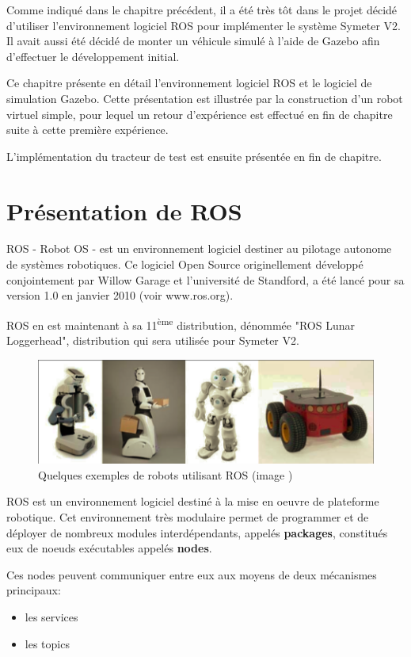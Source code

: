 \documentclass[12pt,a4paper]{report}
\begin{document}
Comme indiqué dans le chapitre précédent, il a été très tôt dans le projet décidé d'utiliser l'environnement logiciel ROS pour implémenter le système Symeter V2. Il avait aussi été décidé de monter un véhicule simulé à l'aide de Gazebo afin d'effectuer le développement initial.



\para Ce chapitre présente en détail l'environnement logiciel ROS et le logiciel de simulation Gazebo. Cette présentation est illustrée par la construction d'un robot virtuel simple, pour lequel un retour d'expérience est effectué en fin de chapitre suite à cette première expérience.

\para L'implémentation du tracteur de test est ensuite présentée en fin de chapitre.

	\section{Présentation de ROS}
	
	ROS - Robot OS - est un environnement logiciel destiner au pilotage autonome de systèmes robotiques. Ce logiciel Open Source originellement développé conjointement par Willow Garage et l'université de Standford, a été lancé pour sa version 1.0 en janvier 2010 (voir www.ros.org).
	
	\para ROS en est maintenant à sa 11\textsuperscript{ème} distribution, dénommée "ROS Lunar Loggerhead", distribution qui sera utilisée pour Symeter V2.
	
	\begin{figure}[h!]
		\centering
		\includegraphics[width=0.7\linewidth]{img/robotsros}
		\caption[robotsros]{Quelques exemples de robots utilisant ROS (image \cite{martinez_learning_2013})}
		\label{fig:robotsros}
	\end{figure}
	
	
	\para ROS est un environnement logiciel destiné à la mise en oeuvre de plateforme robotique. Cet environnement très modulaire permet de programmer et de déployer de nombreux modules interdépendants, appelés \textbf{packages}, constitués eux de noeuds exécutables appelés \textbf{nodes}.
	
	\para Ces nodes peuvent communiquer entre eux aux moyens de deux mécanismes principaux: \begin{itemize}
		\item les services
		\item les topics
	\end{itemize}
	
\end{document}
